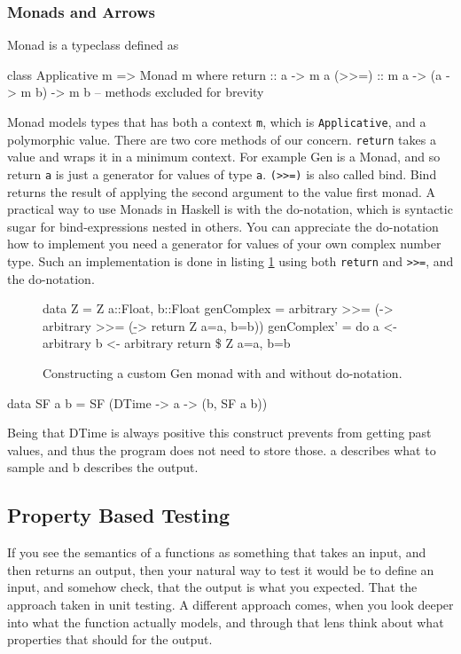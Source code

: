 \subsubsection{Monads and Arrows}
Monad is a typeclass defined as
\begin{hscode}
    class Applicative m => Monad m where
        return :: a -> m a
        (>>=) :: m a -> (a -> m b) -> m b 
        -- methods excluded for brevity
\end{hscode}
Monad models types that has both a context \verb|m|, which is \verb|Applicative|, and a polymorphic value. There are two core methods of our concern. 
\verb|return| takes a value and wraps it in a minimum context. For example Gen is a Monad, and so return \verb|a| is just a generator for values of type \verb|a|.
\verb|(>>=)| is also called bind. Bind returns the result of applying the second argument to the value first monad. 
A practical way to use Monads in Haskell is with the do-notation, which is syntactic sugar for bind-expressions nested in others. You can appreciate the do-notation how to implement you need a generator for values of your own complex number type. Such an implementation is done in listing \ref{lst:genComplex} using both \verb|return| and \verb|>>=|, and the do-notation.
\begin{figure}
    \begin{hscode}
    data Z = Z {a::Float, b::Float}
    genComplex = arbitrary >>= (\a -> arbitrary >>= (\b -> return Z {a=a, b=b}))
    genComplex' = do 
        a <- arbitrary
        b <- arbitrary
        return \$ Z {a=a, b=b}
    \end{hscode} 
    \caption{Constructing a custom Gen monad with and without do-notation.}
    \label{lst:genComplex}
\end{figure}

\begin{hscode}
    data SF a b = SF (DTime  -> a -> (b, SF a b)) 
\end{hscode}
Being that DTime is always positive this construct prevents from  getting past values, and thus the program does not need to store those.
a describes what to sample and b describes the output.

\subsection{Property Based Testing}

If you see the semantics of a functions as something that takes an input, and then returns an output, then your natural way to test it would be to define an input, and somehow check, that the output is what you expected. That the approach taken in unit testing.
A different approach comes, when you look deeper into what the function actually models, and through that lens think about what properties that should for the output.

